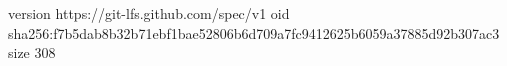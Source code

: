 version https://git-lfs.github.com/spec/v1
oid sha256:f7b5dab8b32b71ebf1bae52806b6d709a7fc9412625b6059a37885d92b307ac3
size 308
